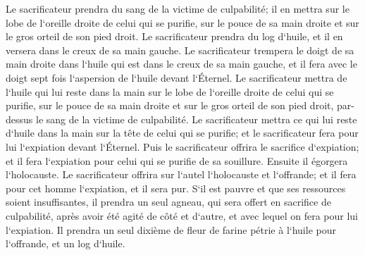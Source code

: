 \verse Le sacrificateur prendra du sang de la victime de culpabilité; il en mettra sur le lobe de l`oreille droite de celui qui se purifie, sur le pouce de sa main droite et sur le gros orteil de son pied droit. 
\verse Le sacrificateur prendra du log d`huile, et il en versera dans le creux de sa main gauche. 
\verse Le sacrificateur trempera le doigt de sa main droite dans l`huile qui est dans le creux de sa main gauche, et il fera avec le doigt sept fois l`aspersion de l`huile devant l`Éternel. 
\verse Le sacrificateur mettra de l`huile qui lui reste dans la main sur le lobe de l`oreille droite de celui qui se purifie, sur le pouce de sa main droite et sur le gros orteil de son pied droit, par-dessus le sang de la victime de culpabilité. 
\verse Le sacrificateur mettra ce qui lui reste d`huile dans la main sur la tête de celui qui se purifie; et le sacrificateur fera pour lui l`expiation devant l`Éternel. 
\verse Puis le sacrificateur offrira le sacrifice d`expiation; et il fera l`expiation pour celui qui se purifie de sa souillure. 
\verse Ensuite il égorgera l`holocauste. Le sacrificateur offrira sur l`autel l`holocauste et l`offrande; et il fera pour cet homme l`expiation, et il sera pur. 
\verse S`il est pauvre et que ses ressources soient insuffisantes, il prendra un seul agneau, qui sera offert en sacrifice de culpabilité, après avoir été agité de côté et d`autre, et avec lequel on fera pour lui l`expiation. Il prendra un seul dixième de fleur de farine pétrie à l`huile pour l`offrande, et un log d`huile. 
